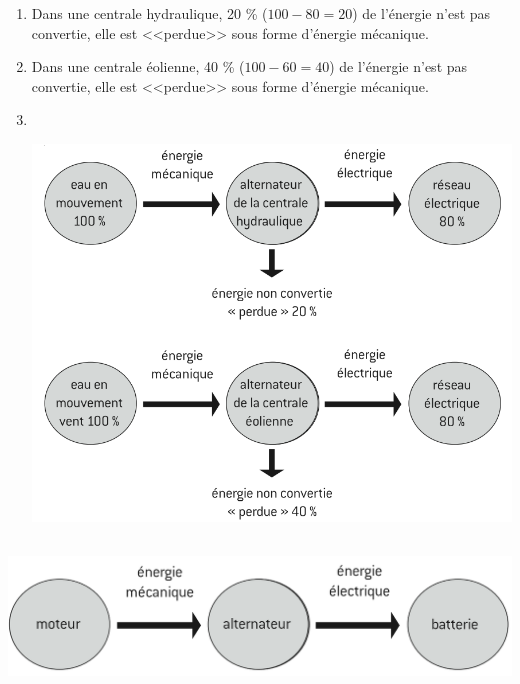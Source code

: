 \documentclass[12pt,a4paper]{article}
\begin{document}
\begin{enumerate}[label=\arabic*.]
	\item Dans une centrale hydraulique, 20 \%  ($ 100 - 80 = 20 $) de l'énergie n'est pas convertie, elle est <<perdue>> sous forme d'énergie mécanique.
	\item Dans une centrale éolienne, 40 \%  ($ 100 - 60 = 40 $) de l'énergie n'est pas convertie, elle est <<perdue>> sous forme d'énergie mécanique.
	\item  \ \\ \begin{center}
		\includegraphics[scale=0.5]{exo8}
	\end{center}
\end{enumerate}

\subsection*{}

\begin{center}
	\includegraphics[scale=0.5]{exo9}
\end{center}

\subsection*{}
\end{document}
